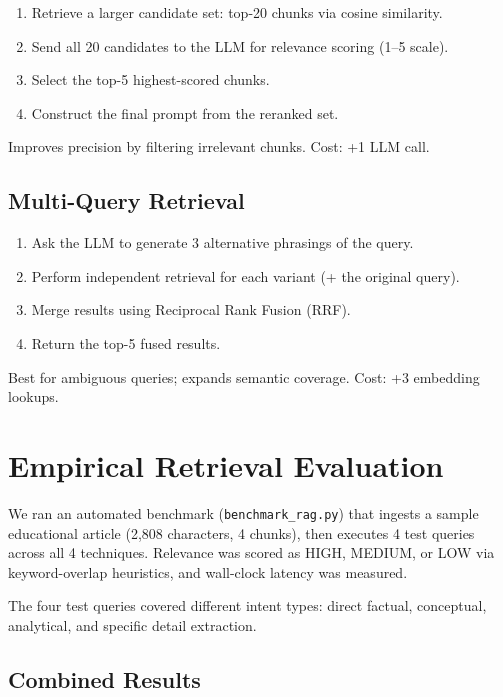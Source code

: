 \documentclass[11pt, letterpaper]{article}
\begin{document}
\begin{enumerate}
    \item Retrieve a larger candidate set: top-20 chunks via cosine similarity.
    \item Send all 20 candidates to the LLM for relevance scoring (1--5 scale).
    \item Select the top-5 highest-scored chunks.
    \item Construct the final prompt from the reranked set.
\end{enumerate}

Improves precision by filtering irrelevant chunks.  Cost: +1 LLM call.

\subsection{Multi-Query Retrieval}

\begin{enumerate}
    \item Ask the LLM to generate 3 alternative phrasings of the query.
    \item Perform independent retrieval for each variant (+ the original query).
    \item Merge results using Reciprocal Rank Fusion (RRF).
    \item Return the top-5 fused results.
\end{enumerate}

Best for ambiguous queries; expands semantic coverage.  Cost: +3 embedding lookups.

\section{Empirical Retrieval Evaluation}

We ran an automated benchmark (\texttt{benchmark\_rag.py}) that ingests a
sample educational article (2,808 characters, 4 chunks), then executes 4 test
queries across all 4 techniques.  Relevance was scored as HIGH, MEDIUM, or LOW
via keyword-overlap heuristics, and wall-clock latency was measured.

The four test queries covered different intent types: direct factual, conceptual,
analytical, and specific detail extraction.

\subsection{Combined Results}
\end{document}
